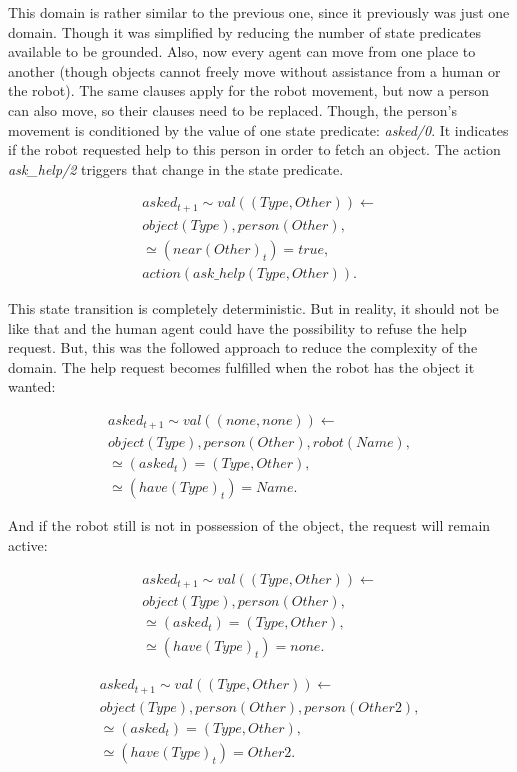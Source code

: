 This domain is rather similar to the previous one, since it previously was just one 
domain. Though it was simplified by reducing the number of state predicates available
to be grounded. Also, now every agent can move from one place to another (though objects 
cannot freely move without assistance from a human or the robot). The same clauses apply 
for the robot movement, but now a person can also move, so their clauses need to be replaced.
Though, the person's movement is conditioned by the value of one state predicate: \textit{asked/0}.
It indicates if the robot requested help to this person in order to fetch an object. The action 
\textit{ask\_help/2} triggers that change in the state predicate.

\begin{align*} 
    asked_{t+1} \sim val((Type, Other)) \leftarrow \\
    object(Type), person(Other), \\
    \simeq(near(Other)_t) = true, \\
    action(ask\_help(Type, Other)).
\end{align*}

This state transition is completely deterministic. But in reality, it should not be like that and the human 
agent could have the possibility to refuse the help request. But, this was the followed approach to reduce the 
complexity of the domain. The help request becomes fulfilled when the robot has the object it wanted:

\begin{align*} 
    asked_{t+1} \sim val((none, none)) \leftarrow \\
    object(Type), person(Other), robot(Name),\\
    \simeq(asked_t) = (Type, Other), \\
    \simeq(have(Type)_t) = Name.
\end{align*}

And if the robot still is not in possession of the object, the request will remain active:

\begin{align*} 
    asked_{t+1} \sim val((Type, Other)) \leftarrow \\
    object(Type), person(Other), \\
    \simeq(asked_t) = (Type, Other), \\
    \simeq(have(Type)_t) = none.
\end{align*}

\begin{align*} 
    asked_{t+1} \sim val((Type, Other)) \leftarrow \\
    object(Type), person(Other), person(Other2),\\
    \simeq(asked_t) = (Type, Other), \\
    \simeq(have(Type)_t) = Other2.
\end{align*}

